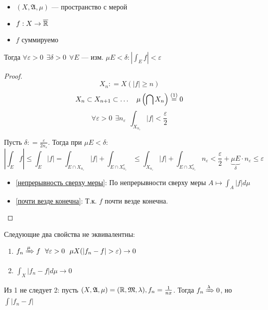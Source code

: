 

\cfoot{}



\begin{theorem}\itemfix
    \begin{itemize}
        \item \((X, \mathfrak{A}, \mu)\) --- пространство с мерой
        \item \(f : X \to \overline {\mathbb{R}}\)
        \item \(f\) суммируемо
    \end{itemize}

    Тогда \(\forall \varepsilon > 0 \ \ \exists \delta > 0 \ \ \forall E \text{ --- изм. } \mu E < \delta : \left|\int_E f\right|< \varepsilon\)
\end{theorem}
\begin{corollary}
    \?
\end{corollary}
\begin{proof}
    \[X_n : = X(|f| \geq n)\]
    \[X_n \subset X_{n+1} \subset \dots \quad \mu\left( \bigcap X_n \right) \symrefeq{почти везде конечна} 0\]
    \begin{equation}
        \forall \varepsilon > 0 \ \ \exists n_\varepsilon \ \ \int_{X_{n_\varepsilon}} |f| < \frac{\varepsilon}{2} \label{непрерывность сверху меры}
    \end{equation}

    Пусть \(\delta : = \frac{\varepsilon}{2n_\varepsilon} \). Тогда при \(\mu E < \delta\):
    \[|\int_E f| \leq \int_E |f| = \int_{E\cap X_{n_\varepsilon}} |f| + \int_{E\cap X_{n_\varepsilon}^c} \leq \int_{X_{n_\varepsilon}} |f| + \int_{E\cap X_{n_\varepsilon}^c} n_\varepsilon < \frac{\varepsilon}{2} + \underbrace{\mu E}_{\delta} \cdot n_\varepsilon \leq \varepsilon\]

    \begin{itemize}
        \item \eqref{непрерывность сверху меры}: По непрерывности сверху меры \(A \mapsto \int_A |f| d\mu\)
        \item \eqref{почти везде конечна}: Т.к. \(f\) почти везде конечна.
    \end{itemize}
\end{proof}

\begin{remark}
    Следующие два свойства не эквивалентны:
    \begin{enumerate}
        \item \(f_n \xRightarrow{\mu} f \ \ \forall \varepsilon > 0 \ \ \mu X(|f_n - f| > \varepsilon) \to 0\)
        \item \(\int_X |f_n - f| d\mu \to 0\)
    \end{enumerate}

    Из 1 не следует 2: пусть \((X, \mathfrak{A}, \mu) = (\mathbb{R}, \mathfrak{M}, \lambda), f_n = \frac{1}{nx}\). Тогда \(f_n \xRightarrow{\lambda} 0\), но \(\int |f_n - f|\) \?
\end{remark}

